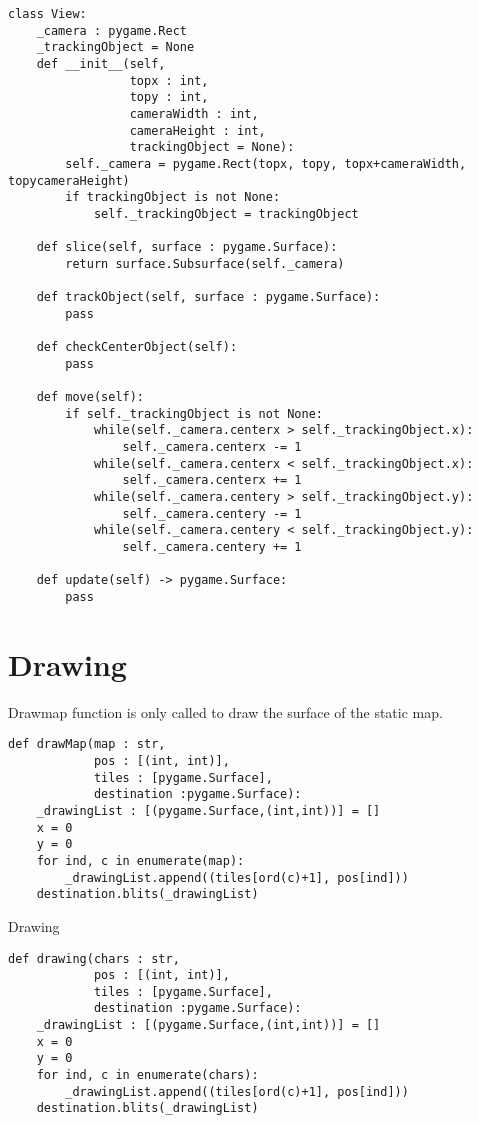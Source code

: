 \documentclass[11pt]{article}
\begin{document}
\begin{verbatim}
class View:
    _camera : pygame.Rect
    _trackingObject = None
    def __init__(self,
                 topx : int,
                 topy : int,
                 cameraWidth : int,
                 cameraHeight : int,
                 trackingObject = None):
        self._camera = pygame.Rect(topx, topy, topx+cameraWidth, topycameraHeight)
        if trackingObject is not None:
            self._trackingObject = trackingObject

    def slice(self, surface : pygame.Surface):
        return surface.Subsurface(self._camera)

    def trackObject(self, surface : pygame.Surface):
        pass

    def checkCenterObject(self):
        pass

    def move(self):
        if self._trackingObject is not None:
            while(self._camera.centerx > self._trackingObject.x):
                self._camera.centerx -= 1
            while(self._camera.centerx < self._trackingObject.x):
                self._camera.centerx += 1
            while(self._camera.centery > self._trackingObject.y):
                self._camera.centery -= 1
            while(self._camera.centery < self._trackingObject.y):
                self._camera.centery += 1

    def update(self) -> pygame.Surface:
        pass
\end{verbatim}



\section{Drawing}
\label{sec:org4aa8e56}

Drawmap function is only called to draw the surface of the static map.

\begin{verbatim}
def drawMap(map : str,
            pos : [(int, int)],
            tiles : [pygame.Surface],
            destination :pygame.Surface):
    _drawingList : [(pygame.Surface,(int,int))] = []
    x = 0
    y = 0
    for ind, c in enumerate(map):
        _drawingList.append((tiles[ord(c)+1], pos[ind]))
    destination.blits(_drawingList)
\end{verbatim}

Drawing

\begin{verbatim}
def drawing(chars : str,
            pos : [(int, int)],
            tiles : [pygame.Surface],
            destination :pygame.Surface):
    _drawingList : [(pygame.Surface,(int,int))] = []
    x = 0
    y = 0
    for ind, c in enumerate(chars):
        _drawingList.append((tiles[ord(c)+1], pos[ind]))
    destination.blits(_drawingList)
\end{verbatim}
\end{document}
